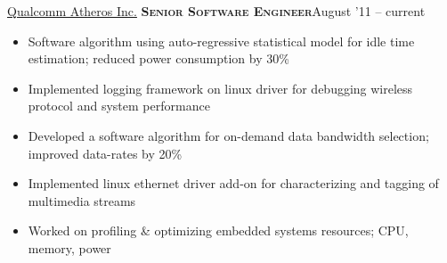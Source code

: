 \documentclass[10pt,a4paper]{article} %
\begin{document}
\vspace{-0.65em}
\headedsection %
{\href{http://www.qca.qualcomm.com}{Qualcomm Atheros Inc.}}
{\textsc{\textbf{Senior Software Engineer}}}{August '11 -- current}
\vspace{-1.0em}
\vspace{-0.2em}
\bodytext
  {\begin{itemize}
	\item Software algorithm using auto-regressive statistical model for idle time estimation; reduced power consumption by 30\% 
	\item Implemented logging framework on linux driver for debugging wireless protocol and system performance
	\item Developed a software algorithm for on-demand data bandwidth selection; improved data-rates by 20\%
	\item Implemented linux ethernet driver add-on for characterizing and tagging of multimedia streams%
	\item Worked on profiling \& optimizing embedded systems resources; CPU, memory, power
\end{itemize}}

%
\end{document}
